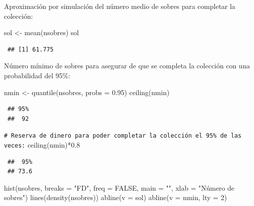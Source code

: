 \documentclass[
]{book}
\newenvironment{Shaded}{\begin{snugshade}}{\end{snugshade}}
\newcommand{\AttributeTok}[1]{\textcolor[rgb]{0.77,0.63,0.00}{#1}}
\newcommand{\CommentTok}[1]{\textcolor[rgb]{0.56,0.35,0.01}{\textit{#1}}}
\newcommand{\ConstantTok}[1]{\textcolor[rgb]{0.00,0.00,0.00}{#1}}
\newcommand{\DecValTok}[1]{\textcolor[rgb]{0.00,0.00,0.81}{#1}}
\newcommand{\FloatTok}[1]{\textcolor[rgb]{0.00,0.00,0.81}{#1}}
\newcommand{\FunctionTok}[1]{\textcolor[rgb]{0.00,0.00,0.00}{#1}}
\newcommand{\NormalTok}[1]{#1}
\newcommand{\OtherTok}[1]{\textcolor[rgb]{0.56,0.35,0.01}{#1}}
\newcommand{\SpecialCharTok}[1]{\textcolor[rgb]{0.00,0.00,0.00}{#1}}
\newcommand{\StringTok}[1]{\textcolor[rgb]{0.31,0.60,0.02}{#1}}
\theoremstyle{break}
\theoremstyle{nonumberplain}
\renewcommand{\CommentTok}[1]{\textcolor[rgb]{0.41,0.41,0.41}{\texttt{#1}}}
\begin{document}
Aproximación por simulación del número medio de sobres para completar la colección:

\begin{Shaded}
\begin{Highlighting}[]
\NormalTok{sol }\OtherTok{\textless{}{-}} \FunctionTok{mean}\NormalTok{(nsobres)}
\NormalTok{sol}
\end{Highlighting}
\end{Shaded}

\begin{verbatim}
 ## [1] 61.775
\end{verbatim}

Número mínimo de sobres para asegurar de que se completa la colección con una probabilidad del 95\%:

\begin{Shaded}
\begin{Highlighting}[]
\NormalTok{nmin }\OtherTok{\textless{}{-}} \FunctionTok{quantile}\NormalTok{(nsobres, }\AttributeTok{probs =} \FloatTok{0.95}\NormalTok{)}
\FunctionTok{ceiling}\NormalTok{(nmin)}
\end{Highlighting}
\end{Shaded}

\begin{verbatim}
 ## 95% 
 ##  92
\end{verbatim}

\begin{Shaded}
\begin{Highlighting}[]
\CommentTok{\# Reserva de dinero para poder completar la colección el 95\% de las veces:}
\FunctionTok{ceiling}\NormalTok{(nmin)}\SpecialCharTok{*}\FloatTok{0.8}
\end{Highlighting}
\end{Shaded}

\begin{verbatim}
 ##  95% 
 ## 73.6
\end{verbatim}

\begin{Shaded}
\begin{Highlighting}[]
\FunctionTok{hist}\NormalTok{(nsobres, }\AttributeTok{breaks =} \StringTok{"FD"}\NormalTok{, }\AttributeTok{freq =} \ConstantTok{FALSE}\NormalTok{,}
     \AttributeTok{main =} \StringTok{""}\NormalTok{, }\AttributeTok{xlab =} \StringTok{"Número de sobres"}\NormalTok{)}
\FunctionTok{lines}\NormalTok{(}\FunctionTok{density}\NormalTok{(nsobres))}
\FunctionTok{abline}\NormalTok{(}\AttributeTok{v =}\NormalTok{ sol)}
\FunctionTok{abline}\NormalTok{(}\AttributeTok{v =}\NormalTok{ nmin, }\AttributeTok{lty =} \DecValTok{2}\NormalTok{)}
\end{Highlighting}
\end{Shaded}
\end{document}
